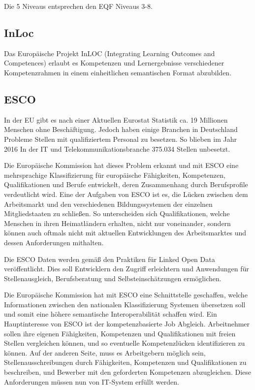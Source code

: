 \vspace{1em}
Die 5 Niveaus entsprechen den EQF Niveaus 3-8. 
\subsection{InLoc}\label{inloc}

Das Europäische Projekt InLOC (Integrating Learning Outcomes and Competences) erlaubt es Kompetenzen und Lernergebnisse verschiedener Kompetenzrahmen in einem einheitlichen semantischen Format abzubilden. 


\subsection{ESCO}

In der EU gibt es nach einer Aktuellen Eurostat Statistik ca. 19 Millionen Menschen ohne Beschäftigung. Jedoch haben einige Branchen in Deutschland Probleme Stellen mit qualifiziertem Personal zu besetzen. So blieben im Jahr 2016 In der IT und Telekommunikationsbranche 375.034 Stellen unbesetzt.\cite{Statista2016}
 
Die Europäische Kommission hat dieses Problem erkannt und mit ESCO eine mehrsprachige Klassifizierung für europäische Fähigkeiten, Kompetenzen, Qualifikationen und Berufe entwickelt, deren Zusammenhang durch Berufsprofile verdeutlicht wird.
 Eine der Aufgaben von ESCO ist es, die Lücken zwischen dem Arbeitsmarkt und den verschiedenen Bildungssystemen der einzelnen Mitgliedstaaten zu schließen. So unterscheiden sich Qualifikationen, welche Menschen in ihren Heimatländern erhalten, nicht nur voneinander, sondern können auch oftmals nicht mit aktuellen Entwicklungen des Arbeitsmarktes und dessen Anforderungen mithalten.
\newline

Die ESCO Daten werden gemäß den Praktiken für Linked Open Data veröffentlicht. Dies soll Entwicklern den Zugriff erleichtern und Anwendungen für Stellenausgleich, Berufsberatung und Selbsteinschätzungen ermöglichen.\newline

Die Europäische Kommission hat mit ESCO eine Schnittstelle geschaffen, welche Informationen zwischen den nationalen Klassifizierung Systemen übersetzen soll und somit eine höhere semantische Interoperabilität schaffen wird. Ein Hauptinteresse von ESCO ist der kompetenzbasierte Job Abgleich. Arbeitnehmer sollen ihre eigenen Fähigkeiten, Kompetenzen und Qualifikationen mit freien Stellen vergleichen können, und so eventuelle Kompetenzlücken identifizieren zu können. Auf der anderen Seite, muss es Arbeitgebern möglich sein, Stellenausschreibungen durch  Fähigkeiten, Kompetenzen und Qualifikationen zu beschreiben, und Bewerber mit den geforderten Kompetenzen abzugleichen. Diese Anforderungen müssen nun von IT-System erfüllt werden. 

